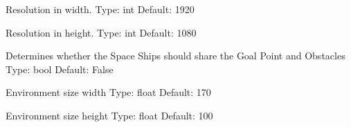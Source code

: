 \documentclass[letterpaper,10pt,english]{sphinxmanual}
\begin{document}
\begin{fulllineitems}
\begin{fulllineitems}
\end{fulllineitems}


\begin{fulllineitems}
\label{\detokenize{pomdp_spaceship_env:pomdp_spaceship_env.Config.ResX}}
Resolution in width.
Type: int
Default: 1920

\end{fulllineitems}


\begin{fulllineitems}
\label{\detokenize{pomdp_spaceship_env:pomdp_spaceship_env.Config.ResY}}
Resolution in height.
Type: int
Default: 1080

\end{fulllineitems}


\begin{fulllineitems}
\label{\detokenize{pomdp_spaceship_env:pomdp_spaceship_env.Config.ShareEnvs}}
Determines whether the Space Ships should share the Goal Point and Obstacles
Type: bool
Default: False

\end{fulllineitems}


\begin{fulllineitems}
\label{\detokenize{pomdp_spaceship_env:pomdp_spaceship_env.Config.SizeX}}
Environment size width
Type: float
Default: 170

\end{fulllineitems}


\begin{fulllineitems}
\label{\detokenize{pomdp_spaceship_env:pomdp_spaceship_env.Config.SizeY}}
Environment size height
Type: float
Default: 100


\end{fulllineitems}
\end{fulllineitems}
\end{document}
